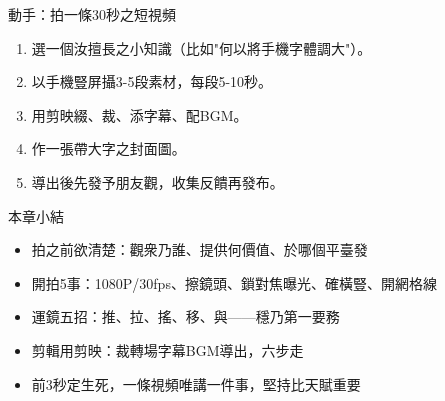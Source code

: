 \begin{tcbpractice}{動手：拍一條30秒之短視頻}
\begin{enumerate}
  \item 選一個汝擅長之小知識（比如"何以將手機字體調大"）。
  \item 以手機豎屏攝3-5段素材，每段5-10秒。
  \item 用剪映綴、裁、添字幕、配BGM。
  \item 作一張帶大字之封面圖。
  \item 導出後先發予朋友觀，收集反饋再發布。
\end{enumerate}

\end{tcbpractice}

\begin{tcbsummary}{本章小結}
\begin{itemize}
  \item 拍之前欲清楚：觀衆乃誰、提供何價值、於哪個平臺發
  \item 開拍5事：1080P/30fps、擦鏡頭、鎖對焦曝光、確橫豎、開網格線
  \item 運鏡五招：推、拉、搖、移、與——穩乃第一要務
  \item 剪輯用剪映：裁轉場字幕BGM導出，六步走
  \item 前3秒定生死，一條視頻唯講一件事，堅持比天賦重要
\end{itemize}

\end{tcbsummary}
